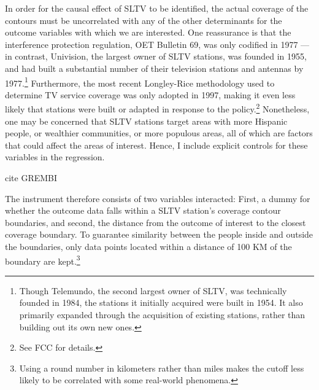 \documentclass[11pt]{article}
\begin{document}
In order for the causal effect of SLTV to be identified, the actual coverage of the contours must be uncorrelated with any of the other determinants for the outcome variables with which we are interested. One reassurance is that the interference protection regulation, OET Bulletin 69, was only codified in 1977 --- in contrast, Univision, the largest owner of SLTV stations, was founded in 1955, and had built a substantial number of their television stations and antennas by 1977.\footnote{ Though Telemundo, the second largest owner of SLTV, was technically founded in 1984, the stations it initially acquired were built in 1954. It also primarily expanded through the acquisition of existing stations, rather than building out its own new ones. } Furthermore, the most recent Longley-Rice methodology used to determine TV service coverage was only adopted in 1997, making it even less likely that stations were built or adapted in response to the policy.\footnote{ See FCC\cite{noauthor_oet_2004} for details.} Nonetheless, one may be concerned that SLTV stations target areas with more Hispanic people, or wealthier communities, or more populous areas, all of which are factors that could affect the areas of interest. Hence, I include explicit controls for these variables in the regression.

cite GREMBI 

The instrument therefore consists of two variables interacted: First, a dummy for whether the outcome data falls within a SLTV station's coverage contour boundaries, and second, the distance from the outcome of interest to the closest coverage boundary. To guarantee similarity between the people inside and outside the boundaries, only data points located within a distance of 100 KM of the boundary are kept.\footnote{ Using a round number in kilometers rather than miles makes the cutoff less likely to be correlated with some real-world phenomena.} 
\end{document}
